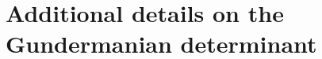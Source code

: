 \chapter[Shorter running title]{Additional details on the Gundermanian determinant}
\lipsum[100]


\printbibliography


% 

	

	











